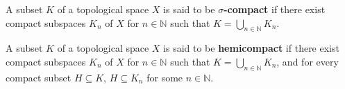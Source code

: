 \documentclass{article}
\begin{document}
	\begin{definition}
	  A subset \(K\) of a topological space \(X\) is said to be \textbf{\(\sigma\)-compact} if
	  there exist compact subspaces \(K_n\) of \(X\) for \(n\in\mathbb N\) such that
	  \(K=\bigcup_{n\in\mathbb N} K_n\).
	\end{definition}
	
	\begin{definition}
	  A subset \(K\) of a topological space \(X\) is said to be \textbf{hemicompact} if
	  there exist compact subspaces \(K_n\) of \(X\) for \(n\in\mathbb N\) such that
	  \(K=\bigcup_{n\in\mathbb N} K_n\), and for every compact subset \(H\subseteq K\),
	  \(H\subseteq K_n\) for some \(n\in\mathbb N\).
	\end{definition}
	
\end{document}
